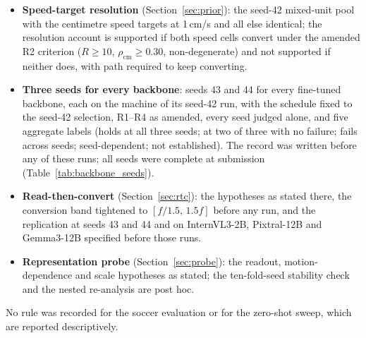 \documentclass[preprint,number]{elsarticle}
\begin{document}
\begin{itemize}
\item \textbf{Speed-target resolution} (Section~\ref{sec:prior}): the seed-42
  mixed-unit pool with the centimetre speed targets at 1\,cm/s and all else
  identical; the resolution account is supported if both speed cells convert
  under the amended R2 criterion ($R\ge10$, $\rho_{\mathrm{cm}}\ge0.30$,
  non-degenerate) and not supported if neither does, with path required to keep
  converting.
\item \textbf{Three seeds for every backbone}: seeds 43 and 44 for every
  fine-tuned backbone, each on the machine of its seed-42 run, with the
  schedule fixed to the seed-42 selection, R1--R4 as amended, every seed judged
  alone, and five aggregate labels (holds at all three seeds; at two of three
  with no failure; fails across seeds; seed-dependent; not established). The
  record was written before any of these runs; all seeds were complete at
  submission (Table~\ref{tab:backbone_seeds}).
\item \textbf{Read-then-convert} (Section~\ref{sec:rtc}): the hypotheses as
  stated there, the conversion band tightened to $[f/1.5,\,1.5f]$ before any
  run, and the replication at seeds 43 and 44 and on InternVL3-2B, Pixtral-12B
  and Gemma3-12B specified before those runs.
\item \textbf{Representation probe} (Section~\ref{sec:probe}): the readout,
  motion-dependence and scale hypotheses as stated; the ten-fold-seed
  stability check and the nested re-analysis are post hoc.
\end{itemize}

No rule was recorded for the soccer evaluation or for the zero-shot sweep,
which are reported descriptively.
\end{document}
